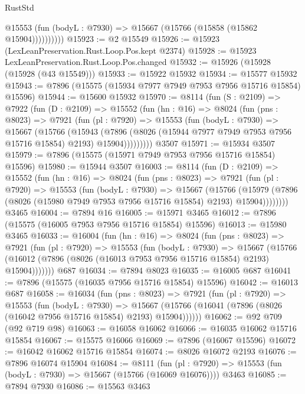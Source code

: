 \begin{lexlean}{RustStd}
\begin{coremodule}
              @15553 (fun (bodyL : @7930) => @15667 (@15766 (@15858 (@15862 @15904))))))))))
@15923 := @2 @15549
@15926 := @15923 (LexLeanPreservation.Rust.Loop.Pos.kept @2374)
@15928 := @15923 LexLeanPreservation.Rust.Loop.Pos.changed
@15932 := @15926 (@15928 (@15928 (@43 @15549)))
@15933 := @15922 @15932
@15934 := @15577 @15932
@15943 := @7896 (@15575 (@15934 @7977 @7949 @7953 @7956 @15716 @15854) @15596)
@15944 := @15600 @15932
@15970 := @8114
    (fun (S : @2109) =>
    @7922
      (fun (D : @2109) =>
      @15552
        (fun (hn : @16) =>
        @8024
          (fun (pns : @8023) =>
          @7921
            (fun (pl : @7920) =>
            @15553
              (fun (bodyL : @7930) =>
              @15667
                (@15766
                  (@15943
                    (@7896
                      (@8026 (@15944 @7977 @7949 @7953 @7956 @15716 @15854) @2193)
                      @15904)))))))))
    @3507
@15971 := @15934 @3507
@15979 := @7896 (@15575 (@15971 @7949 @7953 @7956 @15716 @15854) @15596)
@15980 := @15944 @3507
@16003 := @8114
    (fun (D : @2109) =>
    @15552
      (fun (hn : @16) =>
      @8024
        (fun (pns : @8023) =>
        @7921
          (fun (pl : @7920) =>
          @15553
            (fun (bodyL : @7930) =>
            @15667
              (@15766
                (@15979 (@7896 (@8026 (@15980 @7949 @7953 @7956 @15716 @15854) @2193) @15904))))))))
    @3465
@16004 := @7894 @16
@16005 := @15971 @3465
@16012 := @7896 (@15575 (@16005 @7953 @7956 @15716 @15854) @15596)
@16013 := @15980 @3465
@16033 := @16004
    (fun (hn : @16) =>
    @8024
      (fun (pns : @8023) =>
      @7921
        (fun (pl : @7920) =>
        @15553
          (fun (bodyL : @7930) =>
          @15667
            (@15766 (@16012 (@7896 (@8026 (@16013 @7953 @7956 @15716 @15854) @2193) @15904)))))))
    @687
@16034 := @7894 @8023
@16035 := @16005 @687
@16041 := @7896 (@15575 (@16035 @7956 @15716 @15854) @15596)
@16042 := @16013 @687
@16058 := @16034
    (fun (pns : @8023) =>
    @7921
      (fun (pl : @7920) =>
      @15553
        (fun (bodyL : @7930) =>
        @15667 (@15766 (@16041 (@7896 (@8026 (@16042 @7956 @15716 @15854) @2193) @15904))))))
@16062 := @92 @709 (@92 @719 @98)
@16063 := @16058 @16062
@16066 := @16035 @16062 @15716 @15854
@16067 := @15575 @16066
@16069 := @7896 (@16067 @15596)
@16072 := @16042 @16062 @15716 @15854
@16074 := @8026 @16072 @2193
@16076 := @7896 @16074 @15904
@16084 := @8111
    (fun (pl : @7920) => @15553 (fun (bodyL : @7930) => @15667 (@15766 (@16069 @16076))))
    @3463
@16085 := @7894 @7930
@16086 := @15563 @3463

\end{coremodule}
\end{lexlean}
